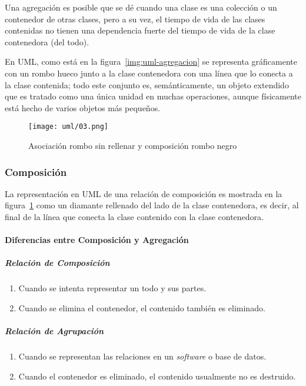 Una agregación es posible que se dé cuando una clase es una colección o un contenedor de otras clases, pero a su vez, el tiempo de vida de las clases contenidas no tienen una dependencia fuerte del tiempo de vida de la clase contenedora (del todo). 


En UML, como está en la figura~\ref{img:uml-agregacion} se representa gráficamente con un rombo hueco junto a la clase contenedora con una línea que lo conecta a la clase contenida; todo este conjunto es, semánticamente, un objeto extendido que es tratado como una única unidad en muchas operaciones, aunque físicamente está hecho de varios objetos más pequeños.

\begin{figure}[H] 
    \centering
    \texttt{[image: uml/03.png]}
    \caption{Asociación rombo sin rellenar y composición rombo negro}
    \label{img:uml-composicion}
\end{figure}

\subsubsection*{Composición}

La representación en UML de una relación de composición es mostrada en la figura~\ref{img:uml-composicion} como un diamante rellenado del lado de la clase contenedora, es decir, al final de la línea que conecta la clase contenido con la clase contenedora.


\paragraph*{Diferencias entre Composición y Agregación}

\subparagraph*{Relación de Composición}

\begin{enumerate}
    \item Cuando se intenta representar un todo y sus partes.
    \item Cuando se elimina el contenedor, el contenido también es eliminado.
\end{enumerate}


\subparagraph*{Relación de Agrupación}

\begin{enumerate}
    \item Cuando se representan las relaciones en un \textit{software} o base de datos. 
    \item Cuando el contenedor es eliminado, el contenido usualmente no es destruido.
\end{enumerate}